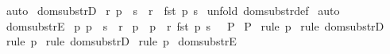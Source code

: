 \begin{isabellebody}
\isamarkupfalse%
\ auto\isanewline
{}\isamarkupfalse%
%
\endisatagproof
{\isafoldproof}%
%
\isadelimproof
\isanewline
%
\endisadelimproof
\isanewline
\isanewline
{}\isamarkupfalse%
\ dom{\isacharunderscore}substrD{}{\isacharcolon}\isanewline
\ {\isachardoublequoteopen}{\isacharbang}{\isacharbang}r{\isachardot}\ p\ {\isacharcolon}\ {\isacharparenleft}s\ {\isacharless}{\isacharminus}{\isacharcolon}\ r{\isacharparenright}\ {\isacharequal}{\isacharequal}{\isachargreater}\ fst\ p\ {\isachartilde}{\isacharcolon}s{\isachardoublequoteclose}\isanewline
%
\isadelimproof
%
\endisadelimproof
%
\isatagproof
{}\isamarkupfalse%
\ {\isacharparenleft}unfold\ dom{\isacharunderscore}substr{\isacharunderscore}def{\isacharparenright}\isanewline
{}\isamarkupfalse%
\ auto\isanewline
{}\isamarkupfalse%
%
\endisatagproof
{\isafoldproof}%
%
\isadelimproof
\isanewline
%
\endisadelimproof
\isanewline
{}\isamarkupfalse%
\ dom{\isacharunderscore}substrE{}{\isacharcolon}\isanewline
{}\ p{}{\isacharcolon}\ {\isachardoublequoteopen}p\ {\isacharcolon}\ {\isacharparenleft}s\ {\isacharless}{\isacharminus}{\isacharcolon}\ r{\isacharparenright}{\isachardoublequoteclose}\isanewline
{}\ p{}{\isacharcolon}\ {\isachardoublequoteopen}{\isacharbrackleft}{\isacharbar}\ p\ {\isacharcolon}\ r{\isacharsemicolon}\ fst\ p\ {\isachartilde}{\isacharcolon}s\ {\isacharbar}{\isacharbrackright}\ {\isacharequal}{\isacharequal}{\isachargreater}\ P{\isachardoublequoteclose}\isanewline
{}\ {\isachardoublequoteopen}P{\isachardoublequoteclose}\isanewline
%
\isadelimproof
%
\endisadelimproof
%
\isatagproof
{}\isamarkupfalse%
\ {\isacharparenleft}rule\ p{}{\isacharparenright}\isanewline
{}\isamarkupfalse%
\ {\isacharparenleft}rule\ dom{\isacharunderscore}substrD{}{\isacharparenright}\isanewline
{}\isamarkupfalse%
\ {\isacharparenleft}rule\ p{}{\isacharparenright}\isanewline
{}\isamarkupfalse%
\ {\isacharparenleft}rule\ dom{\isacharunderscore}substrD{}{\isacharparenright}\isanewline
{}\isamarkupfalse%
\ {\isacharparenleft}rule\ p{}{\isacharparenright}\isanewline
{}\isamarkupfalse%
%
\endisatagproof
{\isafoldproof}%
%
\isadelimproof
\isanewline
%
\endisadelimproof
\isanewline
\isanewline
{}\isamarkupfalse%
\ dom{\isacharunderscore}substrE{\isacharcolon}\isanewline

\end{isabellebody}
